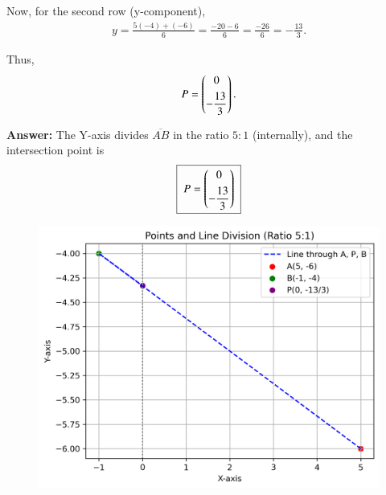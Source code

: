 \documentclass[journal]{IEEEtran}
\begin{document}
Now, for the second row (y-component),
\begin{align}
y=\frac{5(-4)+(-6)}{6} 
=\frac{-20-6}{6} 
=\frac{-26}{6} 
=-\frac{13}{3}.
\end{align}

Thus,
\begin{align}
P=\begin{pmatrix}0\\[4pt]-\dfrac{13}{3}\end{pmatrix}.
\end{align}

\textbf{Answer:} The Y-axis divides \(\overline{AB}\) in the ratio \(5:1\) (internally), and the intersection point is
\begin{align}
\boxed{\;P=\begin{pmatrix}0\\[4pt]-\dfrac{13}{3}\end{pmatrix}\;}
\end{align}
\begin{figure}[H]
    \centering
    \includegraphics[width=0.5\columnwidth]{figs/fig1.png}
    \caption{}
    \label{fig:fig1}
\end{figure}
\end{document}
